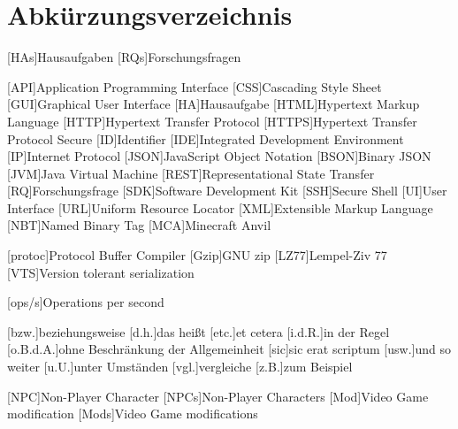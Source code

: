 \chapter*{Abkürzungsverzeichnis}


[HAs]{Hausaufgaben}
[RQs]{Forschungsfragen}

\begin{acronym}[XXXXXX] %
    [API]{Application Programming Interface}
    [CSS]{Cascading Style Sheet}
    [GUI]{Graphical User Interface}
    [HA]{Hausaufgabe}
    [HTML]{Hypertext Markup Language}
    [HTTP]{Hypertext Transfer Protocol}
    [HTTPS]{Hypertext Transfer Protocol Secure}
    [ID]{Identifier}
    [IDE]{Integrated Development Environment}
    [IP]{Internet Protocol}
    [JSON]{JavaScript Object Notation}
    [BSON]{Binary JSON}
    [JVM]{Java Virtual Machine}
    [REST]{Representational State Transfer}
    [RQ]{Forschungsfrage}
    [SDK]{Software Development Kit}
    [SSH]{Secure Shell}
    [UI]{User Interface}
    [URL]{Uniform Resource Locator}
    [XML]{Extensible Markup Language}
    [NBT]{Named Binary Tag}
    [MCA]{Minecraft Anvil}

    \vspace{\parskip}

    [protoc]{Protocol Buffer Compiler}
    [Gzip]{GNU zip}
    [LZ77]{Lempel-Ziv 77}
    [VTS]{Version tolerant serialization}
    
    \vspace{\parskip}

    [ops/s]{Operations per second}

    \vspace{\parskip}

    [bzw.]{beziehungsweise}
    [d.h.]{das heißt}
    [etc.]{et cetera}
    [i.d.R.]{in der Regel}
    [o.B.d.A.]{ohne Beschränkung der Allgemeinheit}
    [sic]{sic erat scriptum}
    [usw.]{und so weiter}
    [u.U.]{unter Umständen}
    [vgl.]{vergleiche}
    [z.B.]{zum Beispiel}

    \vspace{\parskip}

    [NPC]{Non-Player Character}
    [NPCs]{Non-Player Characters}
    [Mod]{Video Game modification}
    [Mods]{Video Game modifications}
\end{acronym}
